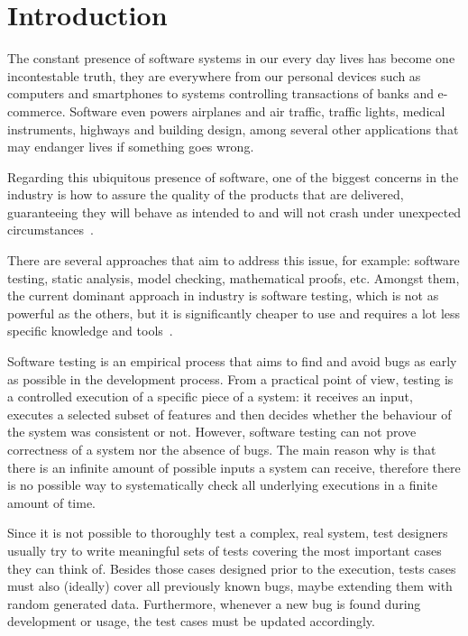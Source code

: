 \chapter{Introduction}





The constant presence of software systems in our every day lives has become one incontestable truth, they are everywhere from our personal devices such as computers and smartphones to systems controlling transactions of banks and e-commerce. Software even powers airplanes and air traffic, traffic lights, medical instruments, highways and building design, among several other applications that may endanger lives if something goes wrong.

Regarding this ubiquitous presence of software, one of the biggest concerns in the industry is how to assure the quality of the products that are delivered, guaranteeing they will behave as intended to and will not crash under unexpected circumstances~\cite{Ammann2008}.

There are several approaches that aim to address this issue, for example: software testing, static analysis, model checking, mathematical proofs, etc. Amongst them, the current dominant approach in industry is software testing, which is not as powerful as the others, but it is significantly cheaper to use and requires a lot less specific knowledge and tools~\cite{Meyer2008, Utting2006}.

Software testing is an empirical process that aims to find and avoid bugs as early as possible in the development process. From a practical point of view, testing is a controlled execution of a specific piece of a system: it receives an input, executes a selected subset of features and then decides whether the behaviour of the system was consistent or not. However, software testing can not prove correctness of a system nor the absence of bugs. The main reason why is that there is an infinite
amount of possible inputs a system can receive, therefore there is no possible way to systematically check all underlying executions in a finite amount of time.

Since it is not possible to thoroughly test a complex, real system, test designers usually try to write meaningful sets of tests covering the most important cases they can think of. Besides those cases designed prior to the execution, tests cases must also (ideally) cover all previously known bugs, maybe extending them with random generated data. Furthermore, whenever a new bug is found during development or usage, the test cases must be updated accordingly.

